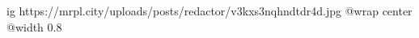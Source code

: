  
 
 
 
 

\ifcmt
  ig https://mrpl.city/uploads/posts/redactor/v3kxs3nqhndtdr4d.jpg
  @wrap center
  @width 0.8
\fi

